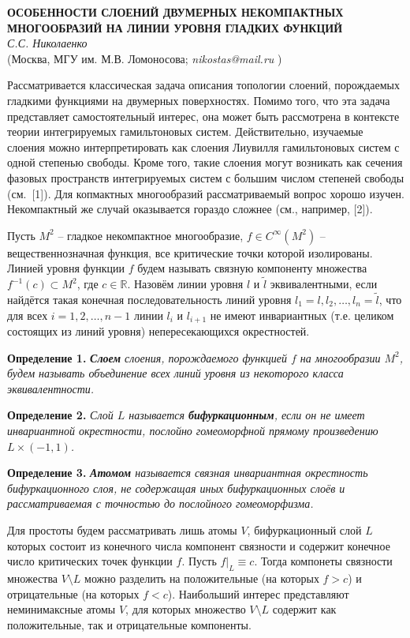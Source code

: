 \begin{center}{ \bf  ОСОБЕННОСТИ СЛОЕНИЙ ДВУМЕРНЫХ НЕКОМПАКТНЫХ МНОГООБРАЗИЙ НА ЛИНИИ УРОВНЯ ГЛАДКИХ ФУНКЦИЙ}\\
{\it С.С. Николаенко} \\
(Москва, МГУ им. М.В. Ломоносова; {\it nikostas@mail.ru} )
\end{center}

Рассматривается классическая задача описания топологии слоений, порождаемых гладкими функциями на двумерных поверхностях. Помимо того, что эта задача представляет самостоятельный интерес, она может быть рассмотрена в контексте теории интегрируемых гамильтоновых систем. Действительно, изучаемые слоения можно интерпретировать как слоения Лиувилля гамильтоновых систем с одной степенью свободы. Кроме того, такие слоения могут возникать как сечения фазовых пространств интегрируемых систем с большим числом степеней свободы (см.~[1]). Для копмактных многообразий рассматриваемый вопрос хорошо изучен. Некомпактный же случай оказывается гораздо сложнее (см., например, [2]).

Пусть $M^2$ -- гладкое некомпактное многообразие, $f\in C^\infty(M^2)$ -- вещественнозначная функция, все критические точки которой изолированы. Линией уровня функции $f$ будем называть связную компоненту множества $f^{-1}(c)\subset M^2$, где $c\in\mathbb R$. Назовём линии уровня $l$ и $\tilde l$ эквивалентными, если найдётся такая конечная последовательность линий уровня $l_1=l,l_2,\ldots,l_n=\tilde l$, что для всех $i=1,2,\ldots,n-1$ линии $l_i$ и $l_{i+1}$ не имеют инвариантных (т.е. целиком состоящих из линий уровня) непересекающихся окрестностей. %

\textbf{Определение 1.}
{\it \textbf{Слоем} слоения, порождаемого функцией $f$ на многообразии $M^2$, будем называть объединение всех линий уровня из некоторого класса эквивалентности.}

\textbf{Определение 2.}
{\it Слой $L$ называется \textbf{бифуркационным}, если он не имеет инвариантной окрестности, послойно гомеоморфной прямому произведению $L\times(-1,1)$.}

\textbf{Определение 3.}
{\it \textbf{Атомом} называется связная инвариантная окрестность бифуркационного слоя, не содержащая иных бифуркационных слоёв и рассматриваемая с точностью до послойного гомеоморфизма.}

Для простоты будем рассматривать лишь атомы $V$, бифуркационный слой $L$ которых состоит из конечного числа компонент связности и содержит конечное число критических точек функции $f$. Пусть $f|_L\equiv c$. Тогда компонеты связности множества $V\setminus L$ можно разделить на положительные (на которых $f>c$) и отрицательные (на которых $f<c$). Наибольший интерес представляют неминимаксные атомы $V$, для которых множество $V\setminus L$ содержит как положительные, так и отрицательные компоненты.

